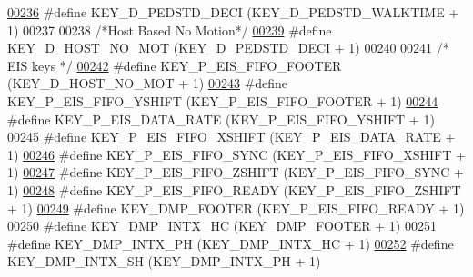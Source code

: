 \begin{DoxyCode}
\hypertarget{dmp_key_8h_source.tex_l00236}{}\hyperlink{dmp_key_8h_a63895bd35b3593d468fa509e71a3a2ac}{00236} \textcolor{preprocessor}{#define KEY\_D\_PEDSTD\_DECI           (KEY\_D\_PEDSTD\_WALKTIME + 1)}
00237 
00238 \textcolor{comment}{/*Host Based No Motion*/}
\hypertarget{dmp_key_8h_source.tex_l00239}{}\hyperlink{dmp_key_8h_a14af95d31024cc2ced44a85f8616a590}{00239} \textcolor{preprocessor}{#define KEY\_D\_HOST\_NO\_MOT           (KEY\_D\_PEDSTD\_DECI + 1)}
00240 
00241 \textcolor{comment}{/* EIS keys */}
\hypertarget{dmp_key_8h_source.tex_l00242}{}\hyperlink{dmp_key_8h_a5acc661ecde5155aa565ab5f632a8445}{00242} \textcolor{preprocessor}{#define KEY\_P\_EIS\_FIFO\_FOOTER       (KEY\_D\_HOST\_NO\_MOT + 1)}
\hypertarget{dmp_key_8h_source.tex_l00243}{}\hyperlink{dmp_key_8h_af09f81cf9cdfda4189808231387d1d8c}{00243} \textcolor{preprocessor}{#define KEY\_P\_EIS\_FIFO\_YSHIFT       (KEY\_P\_EIS\_FIFO\_FOOTER + 1)}
\hypertarget{dmp_key_8h_source.tex_l00244}{}\hyperlink{dmp_key_8h_a070a6ebc8d69e7419e3593b2416d6e97}{00244} \textcolor{preprocessor}{#define KEY\_P\_EIS\_DATA\_RATE         (KEY\_P\_EIS\_FIFO\_YSHIFT + 1)}
\hypertarget{dmp_key_8h_source.tex_l00245}{}\hyperlink{dmp_key_8h_a5a2c2fa3f0fce81a56cb446e370ba863}{00245} \textcolor{preprocessor}{#define KEY\_P\_EIS\_FIFO\_XSHIFT       (KEY\_P\_EIS\_DATA\_RATE + 1)}
\hypertarget{dmp_key_8h_source.tex_l00246}{}\hyperlink{dmp_key_8h_a95eb69c611571b0a2d04c480df10d32c}{00246} \textcolor{preprocessor}{#define KEY\_P\_EIS\_FIFO\_SYNC         (KEY\_P\_EIS\_FIFO\_XSHIFT + 1)}
\hypertarget{dmp_key_8h_source.tex_l00247}{}\hyperlink{dmp_key_8h_a10694004c2c3f6d4926ee14263ad8e3d}{00247} \textcolor{preprocessor}{#define KEY\_P\_EIS\_FIFO\_ZSHIFT       (KEY\_P\_EIS\_FIFO\_SYNC + 1)}
\hypertarget{dmp_key_8h_source.tex_l00248}{}\hyperlink{dmp_key_8h_abf1859a84ecc0d91d724b61dfb8cbb49}{00248} \textcolor{preprocessor}{#define KEY\_P\_EIS\_FIFO\_READY        (KEY\_P\_EIS\_FIFO\_ZSHIFT + 1)}
\hypertarget{dmp_key_8h_source.tex_l00249}{}\hyperlink{dmp_key_8h_aa757f17f6d6165f8e71fe472cfaf86cf}{00249} \textcolor{preprocessor}{#define KEY\_DMP\_FOOTER              (KEY\_P\_EIS\_FIFO\_READY + 1)}
\hypertarget{dmp_key_8h_source.tex_l00250}{}\hyperlink{dmp_key_8h_ad0519db3144da273560b198144f2422c}{00250} \textcolor{preprocessor}{#define KEY\_DMP\_INTX\_HC             (KEY\_DMP\_FOOTER + 1)}
\hypertarget{dmp_key_8h_source.tex_l00251}{}\hyperlink{dmp_key_8h_a9479ccc025c923d07f4854ea7348a706}{00251} \textcolor{preprocessor}{#define KEY\_DMP\_INTX\_PH             (KEY\_DMP\_INTX\_HC + 1)}
\hypertarget{dmp_key_8h_source.tex_l00252}{}\hyperlink{dmp_key_8h_a8dea641bae304fd2969dc1cda327b822}{00252} \textcolor{preprocessor}{#define KEY\_DMP\_INTX\_SH             (KEY\_DMP\_INTX\_PH + 1)}

\end{DoxyCode}

